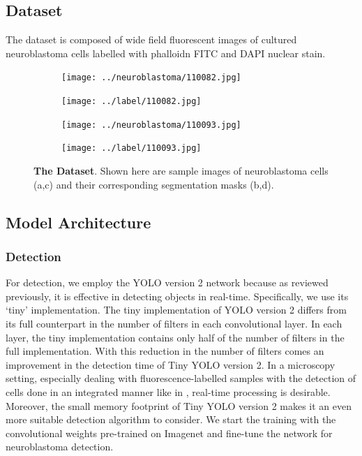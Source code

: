 \documentclass[journal]{IEEEtran}
\begin{document}
\subsection{Dataset}
The dataset is composed of wide field fluorescent images of cultured neuroblastoma cells labelled with phalloidn FITC and DAPI nuclear stain. 
\begin{figure}
\centering
\begin{subfigure}[b]{0.24\linewidth}
\texttt{[image: ../neuroblastoma/110082.jpg]}
\caption{}
\end{subfigure}
\begin{subfigure}[b]{0.24\linewidth}
\texttt{[image: ../label/110082.jpg]}
\caption{}
\end{subfigure}
\begin{subfigure}[b]{0.24\linewidth}
\texttt{[image: ../neuroblastoma/110093.jpg]}
\caption{}
\end{subfigure}
\begin{subfigure}[b]{0.24\linewidth}
\texttt{[image: ../label/110093.jpg]}
\caption{}
\end{subfigure}
\caption{\textbf{The Dataset}. Shown here are sample images of neuroblastoma cells (a,c) and their corresponding segmentation masks (b,d). }
\end{figure}
\subsection{Model Architecture}
\subsubsection{Detection}
For detection, we employ the YOLO version 2 network because as reviewed previously, it is effective in detecting objects in real-time. Specifically, we use its `tiny' implementation. The tiny implementation of YOLO version 2 differs from its full counterpart in the number of filters in each convolutional layer. In each layer, the tiny implementation contains only half of the number of filters in the full implementation. With this reduction in the number of filters comes an improvement in the detection time of Tiny YOLO version 2. In a microscopy setting, especially dealing with fluorescence-labelled samples with the detection of cells done in an integrated manner like in \cite{Waithe544833}, real-time processing is desirable. Moreover, the small memory footprint of Tiny YOLO version 2 makes it an even more suitable detection algorithm to consider. We start the training with the convolutional weights pre-trained on Imagenet and fine-tune the network for neuroblastoma detection.
\end{document}
